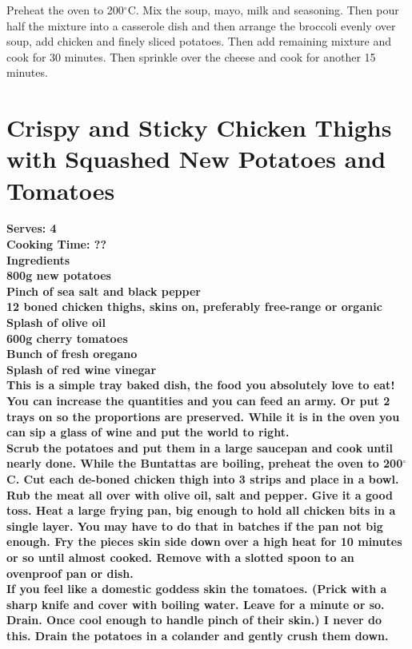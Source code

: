 \documentclass[18pt, oneside]{book}
\begin{document}
Preheat the oven to 200$^{\circ}$C. Mix the soup, mayo, milk and seasoning. Then pour half the mixture into a casserole dish and then arrange the broccoli evenly over soup, add chicken and finely sliced potatoes. Then add remaining mixture and cook for 30 minutes. Then sprinkle over the cheese and cook for another 15 minutes. 

\section{Crispy and Sticky Chicken Thighs with Squashed New Potatoes 
and Tomatoes}


\bf{Serves: 4} \\
\bf{Cooking Time: ??} \\

\bf{Ingredients} \normalfont \\
800g new potatoes \\
Pinch of sea salt and black pepper \\
12 boned chicken thighs, skins on, preferably free-range or organic \\
Splash of olive oil\\
600g cherry tomatoes \\
Bunch of fresh oregano \\
Splash of red wine vinegar \\

This is a simple tray baked dish, the food you absolutely love to eat! You can increase the quantities and you can feed an army. Or put 2 trays on so the proportions are preserved. While it is in the oven you can sip a glass of wine and put the world to right.\\

Scrub the potatoes and put them in a large saucepan and cook until nearly done. While the Buntattas are boiling, preheat the oven to 200$^{\circ}$C. Cut each de-boned chicken thigh into 3 strips and place in a bowl. Rub the meat all over with olive oil, salt and pepper. Give it a good toss. Heat a large frying pan, big enough to hold all 
chicken bits in a single layer. You may have to do that in batches if the pan not big enough. Fry the pieces skin side down over a high heat for 10 minutes or so until almost cooked. Remove with a slotted spoon to an ovenproof pan or dish. \\

If you feel like a domestic goddess skin the tomatoes. (Prick with a sharp knife and cover with boiling water. Leave for a minute or so. Drain. Once cool enough to handle pinch of their skin.) I never do this. Drain the potatoes in a colander and gently crush them down. \\
\end{document}
